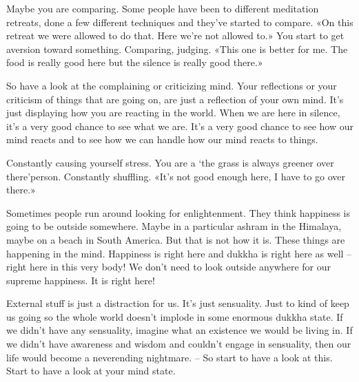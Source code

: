 \documentclass[letterpaper,10pt,english]{sphinxmanual}
\begin{document}
\sphinxAtStartPar
Maybe you are comparing. Some people have been to different meditation retreats, done a few different techniques and they’ve started to compare.
«On  this  retreat  we  were  allowed  to  do  that.  Here  we’re  not  allowed  to.»
You start to get aversion toward something. Comparing, judging. «This one
is better for me. The food is really good here but the silence is really good
there.»

\sphinxAtStartPar
So have a look at the complaining or criticizing mind. Your reflections
or your criticism of things that are going on, are just a reflection of your own
mind. It’s just displaying how you are reacting in the world. When we are
here in silence, it’s a very good chance to see what we are. It’s a very good
chance to see how our mind reacts and to see how we can handle how our
mind reacts to things.

\sphinxAtStartPar
{}
Constantly causing yourself stress. You are a
‘the grass is always greener over there’\sphinxhyphen{}person. Constantly shuffling. «It’s
not good enough here, I have to go over there.»

\sphinxAtStartPar
Sometimes people run around looking for enlightenment. They think
happiness is going to be outside somewhere. Maybe in a particular ashram in
the Himalaya, maybe on a beach in South America. But that is not how it is.
These things are happening in the mind.
Happiness is right here and dukkha is right here as well – right here in this very
body!
   We don’t
need to look outside anywhere for our supreme happiness. It is right here!

\sphinxAtStartPar
External  stuff  is  just  a  distraction  for  us.  It’s  just  sensuality.  Just  to
kind of keep us going so the whole world doesn’t implode in some enormous
dukkha state. If we didn’t have any sensuality, imagine what an existence we
would be living in. If we didn’t have awareness and wisdom and couldn’t
engage in sensuality, then our life would become a never\sphinxhyphen{}ending nightmare.
– So start to have a look at this. Start to have a look at your mind state.
\end{document}
